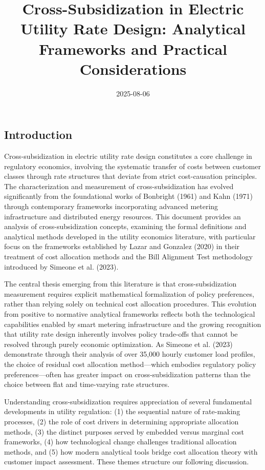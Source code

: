 \documentclass[
  11pt,
]{article}
\title{Cross-Subsidization in Electric Utility Rate Design: Analytical
Frameworks and Practical Considerations}
\author{}
\date{2025-08-06}
\begin{document}
\maketitle


\subsection{Introduction}\label{introduction}

Cross-subsidization in electric utility rate design constitutes a core
challenge in regulatory economics, involving the systematic transfer of
costs between customer classes through rate structures that deviate from
strict cost-causation principles. The characterization and measurement
of cross-subsidization has evolved significantly from the foundational
works of Bonbright (1961) and Kahn (1971) through contemporary
frameworks incorporating advanced metering infrastructure and
distributed energy resources. This document provides an analysis of
cross-subsidization concepts, examining the formal definitions and
analytical methods developed in the utility economics literature, with
particular focus on the frameworks established by Lazar and Gonzalez
(2020) in their treatment of cost allocation methods and the Bill
Alignment Test methodology introduced by Simeone et al. (2023).

The central thesis emerging from this literature is that
cross-subsidization measurement requires explicit mathematical
formalization of policy preferences, rather than relying solely on
technical cost allocation procedures. This evolution from positive to
normative analytical frameworks reflects both the technological
capabilities enabled by smart metering infrastructure and the growing
recognition that utility rate design inherently involves policy
trade-offs that cannot be resolved through purely economic optimization.
As Simeone et al. (2023) demonstrate through their analysis of over
35,000 hourly customer load profiles, the choice of residual cost
allocation method---which embodies regulatory policy preferences---often
has greater impact on cross-subsidization patterns than the choice
between flat and time-varying rate structures.

Understanding cross-subsidization requires appreciation of several
fundamental developments in utility regulation: (1) the sequential
nature of rate-making processes, (2) the role of cost drivers in
determining appropriate allocation methods, (3) the distinct purposes
served by embedded versus marginal cost frameworks, (4) how
technological change challenges traditional allocation methods, and (5)
how modern analytical tools bridge cost allocation theory with customer
impact assessment. These themes structure our following discussion.
\end{document}
